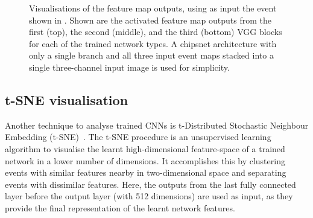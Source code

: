 \begin{figure}
{    }
    \quad
    \caption[Visualisations of trained feature map outputs]
    {Visualisations of the feature map outputs, using as input the event shown in
        . Shown are the activated feature map outputs from
        the first (top), the second (middle), and the third (bottom) VGG blocks for each of the
        trained network types. A chipsnet architecture with only a single branch and all three
        input event maps stacked into a single three-channel input image is used for simplicity.}
    \label{fig:cnn_visualisations}
\end{figure}

\subsection{t-SNE visualisation} %
\label{sec:results_explain_tsne} %

Another technique to analyse trained CNNs is t-Distributed Stochastic Neighbour Embedding
(t-SNE)~\cite{maaten2008}. The t-SNE procedure is an unsupervised learning algorithm to visualise
the learnt high-dimensional feature-space of a trained network in a lower number of dimensions. It
accomplishes this by clustering events with similar features nearby in two-dimensional space and
separating events with dissimilar features. Here, the outputs from the last fully connected layer
before the output layer (with 512 dimensions) are used as input, as they provide the final
representation of the learnt network features.

